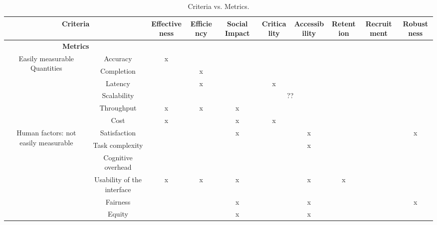 \begin{sidewaystable}
    \centering
    \begin{tabular}{|c|c||c|c|c|c|c|c|c|c|}
    \hline
\multicolumn{2}{|c|}{{\bf Criteria}} & Effectiveness &  Efficiency &  Social Impact &  Criticality &  Accessibility &  Retention  &  Recruitment &  Robustness\\ \hline
\multicolumn{2}{|c|}{{\bf Metrics}} & & & & & & & & \\ \hline \hline
\multirow{6}{2cm}{Easily measurable Quantities} & Accuracy & x & & & & & & & \\ \cline{2-10}
& Completion &  & x & & & & & & \\ \cline{2-10}
& Latency &  & x & & x & & & & \\ \cline{2-10}
& Scalability & \multicolumn{8}{c|}{??} \\ \cline{2-10}
& Throughput & x & x & x & & & & & \\ \cline{2-10}
& Cost & x & & x & x & & & & \\ \hline\hline
\multirow{6}{2cm}{Human factors: not easily measurable} & Satisfaction &  & & x & & x & & & x \\ \cline{2-10}
& Task complexity &  &  &   & & x & & & \\ \cline{2-10}
& Cognitive overhead &  &  &  &  &  &  & & \\ \cline{2-10}
& Usability of the interface & x & x & x &  & x & x & & \\ \cline{2-10}
& Fairness &  &  & x & & x & & & x \\ \cline{2-10}
& Equity &  &  & x & & x & & & \\  \hline\hline

    \end{tabular}
    \caption{Criteria vs. Metrics. }
    \label{tab:metric-vs-props}
\end{sidewaystable}

